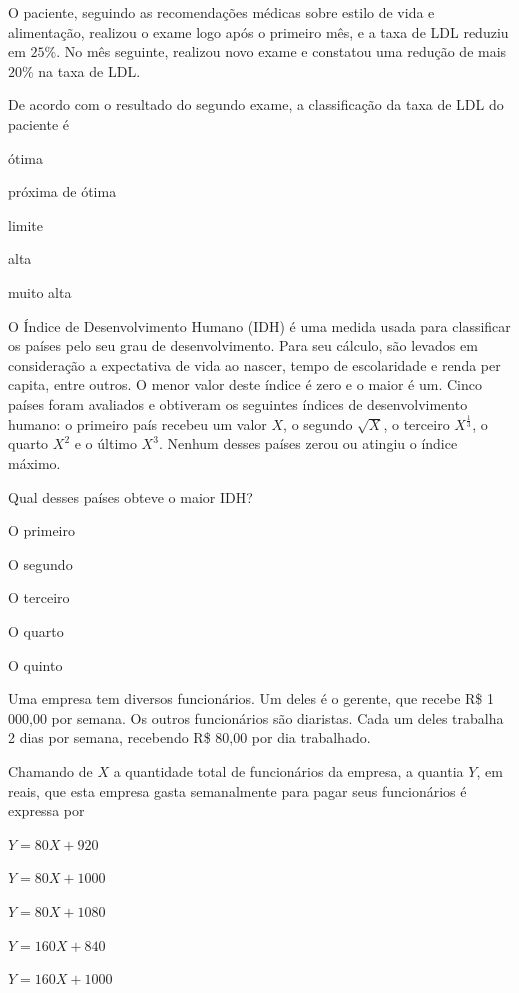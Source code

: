 O paciente, seguindo as recomendações médicas sobre estilo de vida e alimentação,
realizou o exame logo após o primeiro mês, e a taxa de LDL reduziu em $25\%$.
No mês seguinte, realizou novo exame e constatou uma redução de mais $20\%$ na taxa de LDL.

De acordo com o resultado do segundo exame, a classificação da taxa de LDL do paciente é

\begin{alternativas}
\item ótima
\item próxima de ótima
\item limite
\item alta
\item muito alta
\end{alternativas}

\questao
O Índice de Desenvolvimento Humano (IDH) é uma
medida usada para classificar os países pelo seu grau
de desenvolvimento. Para seu cálculo, são levados em
consideração a expectativa de vida ao nascer, tempo de
escolaridade e renda per capita, entre outros. O menor
valor deste índice é zero e o maior é um. Cinco países
foram avaliados e obtiveram os seguintes índices de
desenvolvimento humano: o primeiro país recebeu um
valor $X$, o segundo $\sqrt{X}$, o terceiro $\displaystyle X^{\frac{1}{3}}$,
o quarto $X^2$ e o último $X^3$. Nenhum desses países zerou ou atingiu o
índice máximo.

Qual desses países obteve o maior IDH?

\begin{alternativas}
\item O primeiro
\item O segundo
\item O terceiro
\item O quarto
\item O quinto
\end{alternativas}

\questao
Uma empresa tem diversos funcionários. Um deles
é o gerente, que recebe R\$ 1 000,00 por semana.
Os outros funcionários são diaristas. Cada um deles
trabalha 2 dias por semana, recebendo R\$ 80,00 por
dia trabalhado.

Chamando de $X$ a quantidade total de funcionários
da empresa, a quantia $Y$, em reais, que esta empresa
gasta semanalmente para pagar seus funcionários é
expressa por
\begin{alternativas}
\item $Y = 80X + 920$
\item $Y = 80X + 1000$
\item $Y = 80X + 1080$
\item $Y = 160X + 840$
\item $Y = 160X + 1000$
\end{alternativas}

